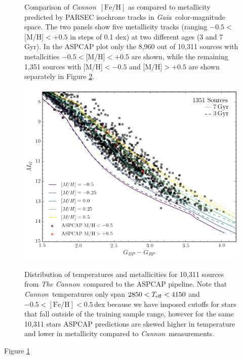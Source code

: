 \documentclass[twocolumn]{aastex62}
\newcommand{\thecannon}{\textsl{The Cannon}}
\newcommand{\cannon}{\textsl{Cannon}}
\newcommand{\gaia}{\textsl{Gaia}}
\newcommand{\feh}{[{\mathrm{Fe}/\mathrm{H}}]}
\begin{document}
\begin{figure}
	\caption{Comparison of \cannon\ $\feh$ as compared to metallicity predicted by PARSEC isochrone tracks \citep{Bressan:2012} in \gaia\ color-magnitude space. The two panels show five metallicity tracks (ranging $-0.5<$[M/H]$<+0.5$ in steps of 0.1 dex) at two different ages (3 and 7 Gyr). In the ASPCAP plot only the 8,960 out of 10,311 sources with metallcities $-0.5<$[M/H]$<+0.5$ are shown, while the remaining 1,351 sources with [M/H]$<-0.5$ and [M/H]$>+0.5$ are shown separately in Figure \ref{fig:isochrone_cmd_2}.}
	\label{fig:isochrone_cmd}
\end{figure}

\begin{figure}
	\includegraphics[width=\linewidth]{figures/aspcap_vs_parsec2.png}
	\caption{}
	\label{fig:isochrone_cmd_2}
\end{figure}

\begin{figure}
	\caption{Distribution of temperatures and metallicities for 10,311 sources from \thecannon\ compared to the ASPCAP pipeline. Note that \cannon\ temperatures only span $2850<T_{\rm eff}<4150$ and $-0.5<\feh<0.5$\,dex because we have imposed cutoffs for stars that fall outside of the training sample range, however for the same 10,311 stars ASPCAP predictions are skewed higher in temperature and lower in metallicity compared to \cannon\ measurements.}
	\label{fig:aspcap_cannon_label_hist} 
\end{figure}

Figure \ref{fig:isochrone_cmd} \\
\end{document}
